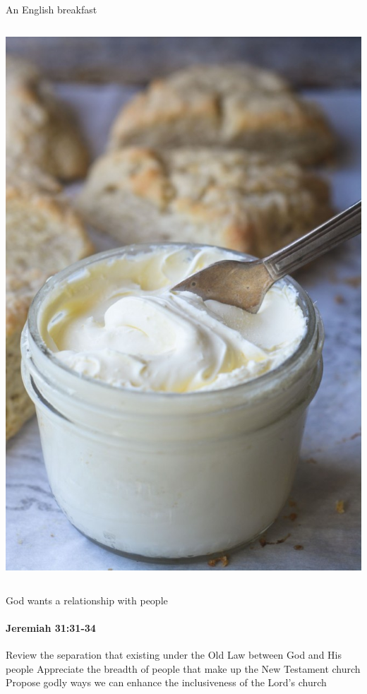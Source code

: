 \begin{frame}{An English breakfast}
\begin{columns}[c]
\begin{column}{0.35\textwidth}
	\includegraphics[width=\columnwidth]{figures/clottedCream.jpg}
\end{column}
\end{columns}

\end{frame}

\begin{frame}{God wants a relationship with people}
\framesubtitle{Jeremiah 31:31-34}
\end{frame}

\begin{goals}
\goal Review the separation that existing under the Old Law between God and His people 
\goal Appreciate the breadth of people that make up the New Testament church
\goal Propose godly ways we can enhance the inclusiveness of the Lord's church

\end{goals}

